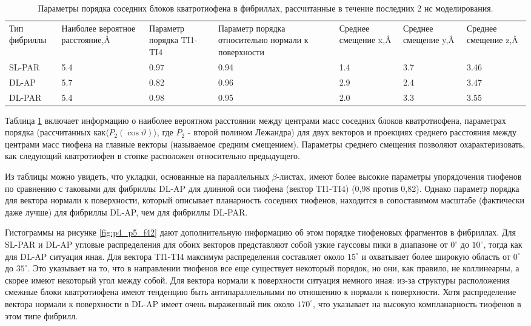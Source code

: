 \begin{table}[H]
    \centering
    \begin{tabularx}{\textwidth}{X|X|X|X|X|X|X}
        Тип фибриллы & Наиболее вероятное расстояние,\AA{} & Параметр порядка TI1-TI4 & Параметр порядка относительно нормали  к  поверхности & Среднее смещение x,\AA{} & Среднее смещение y,\AA{} & Среднее смещение z,\AA{} \\
        SL-PAR & 5.4 & 0.97 & 0.94 & 1.4 & 3.7 & 3.46 \\   
        DL-AP  & 5.7 & 0.82 & 0.96 & 2.9 & 2.4 & 3.47 \\
        DL-PAR & 5.4 & 0.98 & 0.95 & 2.0 & 3.3 & 3.55  
    \end{tabularx}
    \caption{Параметры порядка соседних блоков кватротиофена в фибриллах, рассчитанные в течение последних 2 нс моделирования.}
    \label{tab:p4_t2}
\end{table}

    Таблица \ref{tab:p4_t2} включает информацию о наиболее вероятном расстоянии между центрами масс соседних блоков кватротиофена, параметрах порядка (рассчитанных как$\big \langle P_2(\cos \vartheta )   \big \rangle$, где $P_2$ - второй полином Лежандра) для двух векторов и проекциях среднего расстояния между центрами масс тиофена на главные векторы (называемое средним смещением). Параметры среднего смещения позволяют охарактеризовать, как следующий кватротиофен в стопке расположен относительно предыдущего.

    Из таблицы можно увидеть, что укладки, основанные на параллельных $\beta$-листах, имеют более высокие параметры упорядочения тиофенов по сравнению с таковыми для фибриллы DL-AP для длинной оси тиофена (вектор TI1-TI4) (0,98 против 0,82). Однако параметр порядка для вектора нормали к поверхности, который описывает планарность соседних тиофенов, находится в сопоставимом масштабе (фактически даже лучше) для фибриллы DL-AP, чем для фибриллы DL-PAR.

    Гистограммы на рисунке \ref{fig:p4_p5_f42} дают дополнительную информацию об этом порядке тиофеновых фрагментов в фибриллах. Для SL-PAR и DL-AP угловые распределения для обоих векторов представляют собой узкие гауссовы пики в диапазоне от $0^{\circ}$ до $10^{\circ}$, тогда как для DL-AP ситуация иная. Для вектора TI1-TI4 максимум распределения составляет около $15^{\circ}$ и охватывает более широкую область от $0^{\circ}$ до $35^{\circ}$. Это указывает на то, что в направлении тиофенов все еще существует некоторый порядок, но они, как правило, не коллинеарны, а скорее имеют некоторый угол между собой. Для вектора нормали к поверхности ситуация немного иная: из-за структуры расположения смежные блоки кватротиофена имеют тенденцию быть антипараллельными по отношению к нормали к поверхности. Хотя распределение вектора нормали к поверхности в DL-AP имеет очень выраженный пик около $170^{\circ}$, что указывает на высокую компланарность тиофенов в этом типе фибрилл.

